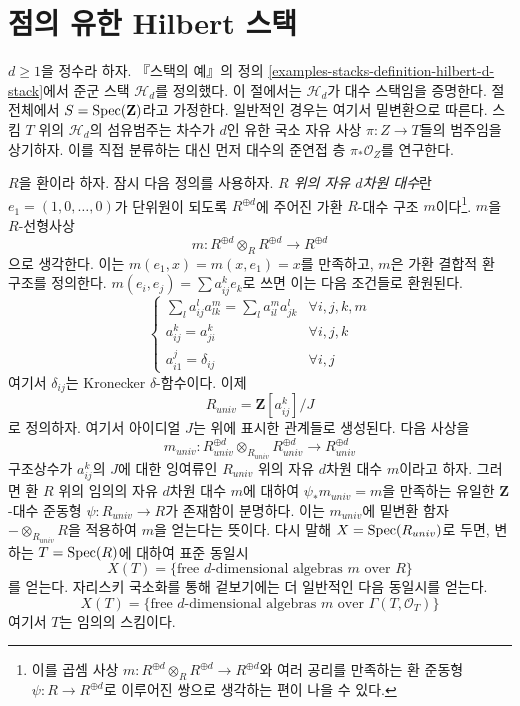 \section{점의 유한 Hilbert 스택}
\label{section-hilbert-point}
\enlargethispage{3pt}

\noindent
$d \geq 1$을 정수라 하자. 『스택의 예』의 정의
\ref{examples-stacks-definition-hilbert-d-stack}에서 준군 스택
$\mathcal{H}_d$를 정의했다. 이 절에서는 $\mathcal{H}_d$가
대수 스택임을 증명한다. 절 전체에서
$S = \mathop{\mathrm{Spec}}(\mathbf{Z})$라고 가정한다. 일반적인 경우는 여기서
밑변환으로 따른다. 스킴 $T$ 위의 $\mathcal{H}_d$의 섬유범주는
차수가 $d$인 유한 국소 자유 사상 $\pi : Z \to T$들의 범주임을
상기하자. 이를 직접 분류하는 대신 먼저 대수의 준연접 층
$\pi_*\mathcal{O}_Z$를 연구한다.

\medskip\noindent
$R$을 환이라 하자. 잠시 다음 정의를 사용하자.
{\it $R$ 위의 자유 $d$차원 대수}란
$e_1 = (1, 0, \ldots, 0)$가 단위원이 되도록 $R^{\oplus d}$에 주어진
가환 $R$-대수 구조 $m$이다\footnote{이를 곱셈 사상
$m : R^{\oplus d} \otimes_R R^{\oplus d} \to R^{\oplus d}$와
여러 공리를 만족하는 환 준동형
$\psi : R \to R^{\oplus d}$로 이루어진 쌍으로 생각하는 편이 나을 수 있다.}.
$m$을 $R$-선형사상
$$
m : R^{\oplus d} \otimes_R R^{\oplus d} \longrightarrow R^{\oplus d}
$$
으로 생각한다. 이는 $m(e_1, x) = m(x, e_1) = x$를 만족하고,
$m$은 가환 결합적 환 구조를 정의한다.
$m(e_i, e_j) = \sum a_{ij}^ke_k$로 쓰면 이는 다음 조건들로 환원된다.
$$
\left\{
\begin{matrix}
\sum_l a_{ij}^la_{lk}^m = \sum_l a_{il}^ma_{jk}^l & \forall i, j, k, m \\
a_{ij}^k = a_{ji}^k & \forall i, j, k \\
a_{i1}^j = \delta_{ij} & \forall i, j
\end{matrix}
\right.
$$
여기서 $\delta_{ij}$는 Kronecker $\delta$-함수이다. 이제
$$
R_{univ} = \mathbf{Z}[a_{ij}^k]/J
$$
로 정의하자. 여기서 아이디얼 $J$는 위에 표시한 관계들로 생성된다.
다음 사상을
$$
m_{univ} :
R_{univ}^{\oplus d} \otimes_{R_{univ}} R_{univ}^{\oplus d}
\longrightarrow
R_{univ}^{\oplus d}
$$
구조상수가 $a_{ij}^k$의 $J$에 대한 잉여류인
$R_{univ}$ 위의 자유 $d$차원 대수 $m$이라고 하자.
그러면 환 $R$ 위의 임의의 자유 $d$차원 대수 $m$에 대하여
$\psi_*m_{univ} = m$을 만족하는 유일한 $\mathbf{Z}$-대수 준동형
$\psi : R_{univ} \to R$가 존재함이 분명하다. 이는
$m_{univ}$에 밑변환 함자 $- \otimes_{R_{univ}} R$을 적용하여
$m$을 얻는다는 뜻이다. 다시 말해 $X = \mathop{\mathrm{Spec}}(R_{univ})$로 두면,
변하는 $T = \mathop{\mathrm{Spec}}(R)$에 대하여 표준 동일시
$$
X(T) = \{\text{free }d\text{-dimensional algebras }m\text{ over }R\}
$$
를 얻는다. 자리스키 국소화를 통해 겉보기에는 더 일반적인
다음 동일시를 얻는다.
\begin{equation}
\label{equation-objects}
X(T) = \{\text{free }d\text{-dimensional algebras }
m\text{ over }\Gamma(T, \mathcal{O}_T)\}
\end{equation}
여기서 $T$는 임의의 스킴이다.

